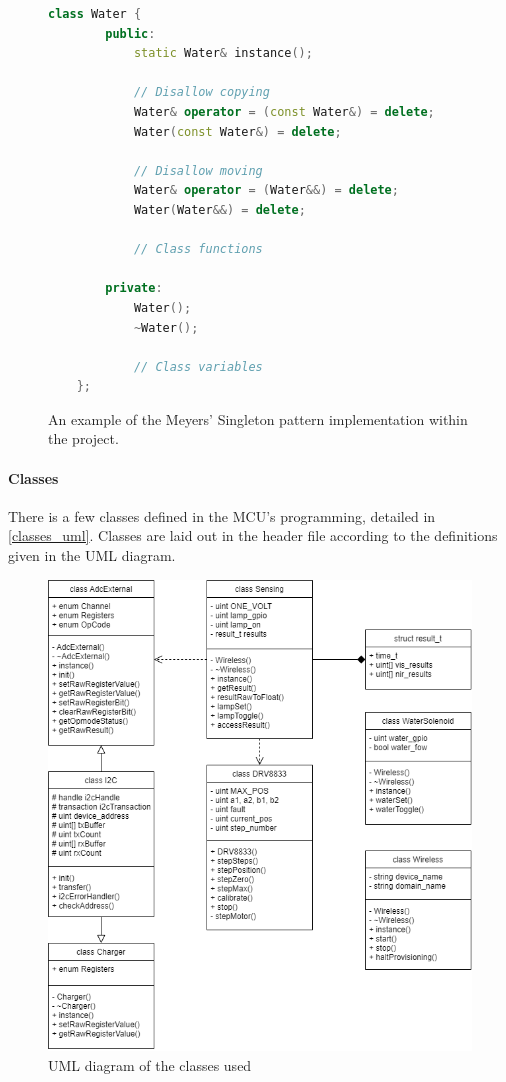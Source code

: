 \begin{figure}
    \centering
    \label{fig:singleton_implementation}
    \caption{An example of the Meyers' Singleton pattern implementation within the project.}
\begin{lstlisting}[language=C++]
    class Water { 
        public:
            static Water& instance();

            // Disallow copying
            Water& operator = (const Water&) = delete;
            Water(const Water&) = delete;

            // Disallow moving
            Water& operator = (Water&&) = delete;
            Water(Water&&) = delete;

            // Class functions
        
        private:
            Water();
            ~Water();

            // Class variables
    };
\end{lstlisting}
\end{figure}

\paragraph{Classes}
There is a few classes defined in the MCU's programming, detailed
in \autoref{classes_uml}. Classes are laid out in the header file
according to the definitions given in the UML diagram.
\begin{figure}[H]
    \caption{UML diagram of the classes used}
    \label{classes_uml}
    \centering
    \includegraphics[width=\textwidth]{images/classes_uml_new.png}
\end{figure}

